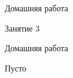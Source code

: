 \begin{homework}[number=2]
	\begin{listofex}
		\item Домашняя работа
	\end{listofex}
\end{homework}

\begin{class}[number=3]
	\begin{listofex}
		\item Занятие 3
	\end{listofex}
\end{class}

\begin{homework}[number=3]
	\begin{listofex}
		\item Домашняя работа
	\end{listofex}
\end{homework}

\begin{class}[number=4]
	\begin{listofex}
		\item Пусто
	\end{listofex}
\end{class}
